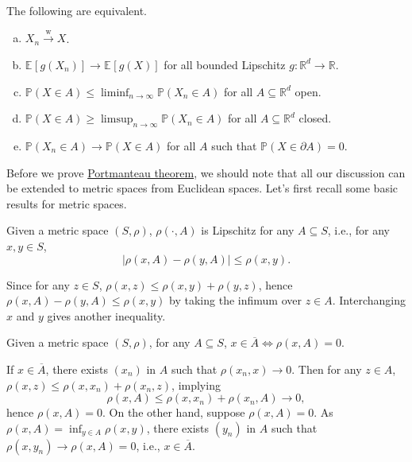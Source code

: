 \begin{theorem}\label{thm:Portmanteau}
	The following are equivalent.
	\begin{enumerate}[(a)]
		\item\label{thm:Portmanteau-a} \(X_n \overset{\text{w} }{\to } X\).
		\item\label{thm:Portmanteau-b} \(\mathbb{E}_{}\left[g(X_n) \right] \to \mathbb{E}_{}\left[g(X) \right] \) for all bounded Lipschitz \(g \colon \mathbb{R} ^d \to \mathbb{R} \).
		\item\label{thm:Portmanteau-c} \(\mathbb{P} (X \in A) \leq \liminf_{n \to \infty} \mathbb{P} (X _n \in A)\) for all \(A \subseteq \mathbb{R} ^d\) open.
		\item\label{thm:Portmanteau-d} \(\mathbb{P} (X \in A) \geq \limsup_{n \to \infty} \mathbb{P} (X _n \in A)\) for all \(A \subseteq \mathbb{R} ^d\) closed.
		\item\label{thm:Portmanteau-e} \(\mathbb{P} (X_n \in A) \to \mathbb{P} (X \in A)\) for all \(A\) such that \(\mathbb{P} (X \in \partial A) = 0\).
	\end{enumerate}
\end{theorem}

Before we prove \hyperref[thm:Portmanteau]{Portmanteau theorem}, we should note that all our discussion can be extended to metric spaces from Euclidean spaces. Let's first recall some basic results for metric spaces.

\begin{claim}
	Given a metric space \((S, \rho )\), \(\rho (\cdot, A)\) is Lipschitz for any \(A \subseteq S\), i.e., for any \(x, y\in S\),
	\[
		\vert \rho (x, A) - \rho (y, A)\vert \leq \rho (x, y).
	\]
\end{claim}
\begin{explanation}
	Since for any \(z\in S\), \(\rho (x, z) \leq \rho (x, y) + \rho (y, z)\), hence \(\rho (x, A) - \rho (y, A) \leq \rho (x, y)\) by taking the infimum over \(z \in A\). Interchanging \(x\) and \(y\) gives another inequality.
\end{explanation}

\begin{claim}
	Given a metric space \((S, \rho )\), for any \(A \subseteq S\), \(x\in \overline{A} \iff \rho (x, A) = 0\).
\end{claim}
\begin{explanation}
	If \(x\in \overline{A} \), there exists \((x_n)\) in \(A\) such that \(\rho (x_n, x) \to 0\). Then for any \(z\in A\), \(\rho (x, z) \leq \rho (x, x_n) + \rho (x_n, z)\), implying
	\[
		\rho (x, A) \leq \rho (x, x_n) + \rho (x_n, A) \to 0,
	\]
	hence \(\rho (x, A) = 0\). On the other hand, suppose \(\rho (x, A) = 0\). As \(\rho (x, A) = \inf _{y\in A} \rho (x, y)\), there exists \((y_n)\) in \(A\) such that \(\rho (x, y_n) \to \rho (x, A) = 0\), i.e., \(x\in \overline{A} \).
\end{explanation}

